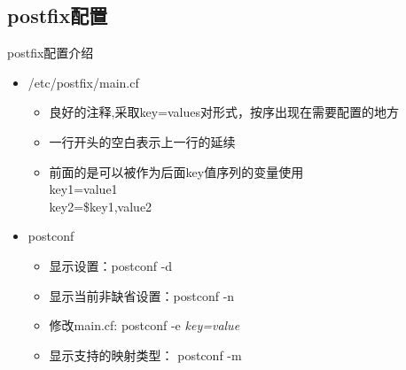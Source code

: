 \subsection{postfix配置}


\begin{frame}{postfix配置介绍}
\begin{itemize}
\item /etc/postfix/main.cf

\begin{itemize}
\item 良好的注释,采取key=values对形式，按序出现在需要配置的地方
\item 一行开头的空白表示上一行的延续
\item 前面的是可以被作为后面key值序列的变量使用\\
key1=value1\\
key2=\$key1,value2
\end{itemize}
\item postconf

\begin{itemize}
\item 显示设置：postconf -d
\item 显示当前非缺省设置：postconf -n
\item 修改main.cf: postconf -e \emph{key=value}
\item 显示支持的映射类型： postconf -m
\end{itemize}
\end{itemize}

\end{frame} 
